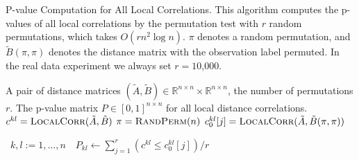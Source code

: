 \documentclass[11pt]{article}
\newcommand{\Real}{\mathbb{R}}
\newcommand{\G}{c}
\newcommand{\Linefor}[2]{%
    \State \algorithmicfor\ {#1}\ \algorithmicdo\ {#2} \algorithmicend\ \algorithmicfor%
}
\newcommand{\rto}{\leftarrow}
\begin{document}
\begin{algorithm}
\caption{P-value Computation for All Local Correlations. This algorithm computes the p-values of all local correlations by the permutation test with $r$ random permutations, which takes $O(rn^2 \log n)$. $\pi$ denotes a random permutation, and $\tilde{B}(\pi,\pi)$ denotes the distance matrix with the observation label permuted. In the real data experiment we always set $r=10$,$000$.}
\label{alg:pval}
\begin{algorithmic}[1]
\Require A pair of distance matrices $(\tilde{A},\tilde{B}) \in \Real^{n \times n} \times \Real^{n \times n}$, the number of permutations $r$.
\Ensure The p-value matrix $P \in [0,1]^{n \times n}$ for all local distance correlations.
\State $\G^{kl}=\textsc{LocalCorr}(\tilde{A},\tilde{B})$ 
\State $\pi=\textsc{RandPerm}(n)$  
\State $\G^{kl}_{0}[j]=\textsc{LocalCorr}(\tilde{A},\tilde{B}(\pi,\pi))$ 
\EndFor

\Linefor{$k,l:=1,\ldots,n$}{$P_{kl} \rto \sum_{j=1}^{r}(\G^{kl} \leq \G^{kl}_{0}[j])/r$}
\EndFunction
\end{algorithmic}
\end{algorithm}
\end{document}
